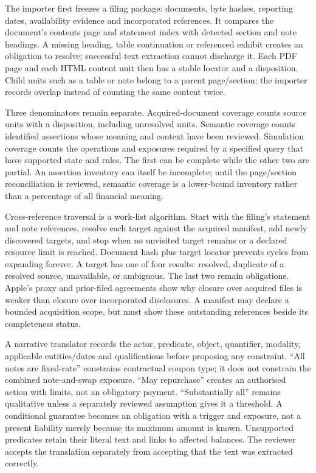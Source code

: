 The importer first freezes a filing package: documents, byte hashes, reporting
dates, availability evidence and incorporated references. It compares the
document's contents page and statement index with detected section and note
headings. A missing heading, table continuation or referenced exhibit creates
an obligation to resolve; successful text extraction cannot discharge it.
Each PDF page and each HTML content unit then has a stable locator and a
disposition. Child units such as a table or note belong to a parent page/section;
the importer records overlap instead of counting the same content twice.

Three denominators remain separate. Acquired-document coverage counts source
units with a disposition, including unresolved units. Semantic coverage counts
identified assertions whose meaning and context have been reviewed. Simulation
coverage counts the operations and exposures required by a specified query
that have supported state and rules. The first can be complete while the other
two are partial. An assertion inventory can itself be incomplete; until the
page/section reconciliation is reviewed, semantic coverage is a lower-bound
inventory rather than a percentage of all financial meaning.

Cross-reference traversal is a work-list algorithm. Start with the filing's
statement and note references, resolve each target against the acquired
manifest, add newly discovered targets, and stop when no unvisited target
remains or a declared resource limit is reached. Document hash plus target
locator prevents cycles from expanding forever. A target has one of four
results: resolved, duplicate of a resolved source, unavailable, or ambiguous.
The last two remain obligations. Apple's proxy and prior-filed agreements
show why closure over acquired files is weaker than closure over incorporated
disclosures. A manifest may declare a bounded acquisition scope, but must show
these outstanding references beside its completeness status.

A narrative translator records the actor, predicate, object, quantifier,
modality, applicable entities/dates and qualifications before proposing any
constraint. ``All notes are fixed-rate'' constrains contractual coupon type;
it does not constrain the combined note-and-swap exposure. ``May repurchase''
creates an authorised action with limits, not an obligatory payment.
``Substantially all'' remains qualitative unless a separately reviewed
assumption gives it a threshold. A conditional guarantee becomes an obligation
with a trigger and exposure, not a present liability merely because its maximum
amount is known. Unsupported predicates retain their literal text and links
to affected balances. The reviewer accepts the translation separately from
accepting that the text was extracted correctly.


